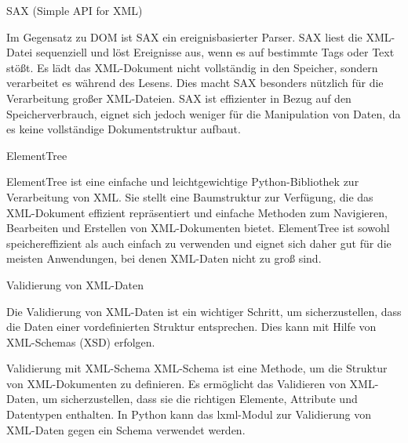 SAX (Simple API for XML)

Im Gegensatz zu DOM ist SAX ein ereignisbasierter Parser.
SAX liest die XML-Datei sequenziell und löst Ereignisse aus, wenn es auf bestimmte Tags oder Text stößt.
Es lädt das XML-Dokument nicht vollständig in den Speicher, sondern verarbeitet es während des Lesens.
Dies macht SAX besonders nützlich für die Verarbeitung großer XML-Dateien.
SAX ist effizienter in Bezug auf den Speicherverbrauch, eignet sich jedoch weniger für die Manipulation von Daten, da es keine vollständige Dokumentstruktur aufbaut.

ElementTree

ElementTree ist eine einfache und leichtgewichtige Python-Bibliothek zur Verarbeitung von XML. Sie stellt eine Baumstruktur zur Verfügung,
die das XML-Dokument effizient repräsentiert und einfache Methoden zum Navigieren, Bearbeiten und Erstellen von XML-Dokumenten bietet.
ElementTree ist sowohl speichereffizient als auch einfach zu verwenden und eignet sich daher gut für die meisten Anwendungen, bei denen XML-Daten nicht zu groß sind.

Validierung von XML-Daten

Die Validierung von XML-Daten ist ein wichtiger Schritt, um sicherzustellen, dass die Daten einer vordefinierten Struktur entsprechen.
Dies kann mit Hilfe von XML-Schemas (XSD) erfolgen.

Validierung mit XML-Schema
XML-Schema ist eine Methode, um die Struktur von XML-Dokumenten zu definieren.
Es ermöglicht das Validieren von XML-Daten, um sicherzustellen, dass sie die richtigen Elemente, Attribute und Datentypen enthalten.
In Python kann das lxml-Modul zur Validierung von XML-Daten gegen ein Schema verwendet werden.


\pagebreak